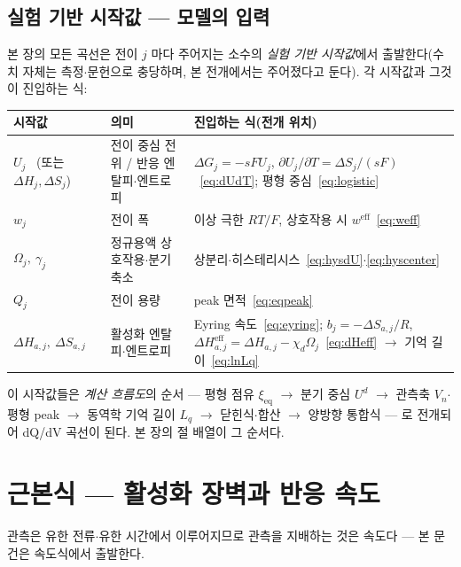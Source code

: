 \documentclass[11pt,a4paper]{article}
\newcommand{\eff}{\mathrm{eff}}
\newcommand{\eq}{\mathrm{eq}}
\begin{document}

\subsection{실험 기반 시작값 — 모델의 입력}\label{sec:inputs}
본 장의 모든 곡선은 전이 $j$ 마다 주어지는 소수의 \emph{실험 기반 시작값}에서 출발한다(수치 자체는 측정$\cdot$문헌으로 충당하며, 본 전개에서는 주어졌다고 둔다). 각 시작값과 그것이 진입하는 식:
\begin{center}
\renewcommand{\arraystretch}{1.25}
\begin{tabular}{p{} p{} p{}}
\toprule
시작값 & 의미 & 진입하는 식(전개 위치) \\
\midrule
$U_j$ \ (또는 $\Delta H_j,\Delta S_j$) & 전이 중심 전위 / 반응 엔탈피$\cdot$엔트로피 & $\Delta G_j=-sFU_j$, $\partial U_j/\partial T=\Delta S_j/(sF)$~\eqref{eq:dUdT}; 평형 중심~\eqref{eq:logistic} \\
$w_j$ & 전이 폭 & 이상 극한 $RT/F$, 상호작용 시 $w^{\eff}$~\eqref{eq:weff} \\
$\Omega_j,\ \gamma_j$ & 정규용액 상호작용$\cdot$분기 축소 & 상분리$\cdot$히스테리시스~\eqref{eq:hysdU}$\cdot$\eqref{eq:hyscenter} \\
$Q_j$ & 전이 용량 & peak 면적~\eqref{eq:eqpeak} \\
$\Delta H_{a,j},\ \Delta S_{a,j}$ & 활성화 엔탈피$\cdot$엔트로피 & Eyring 속도~\eqref{eq:eyring}; $b_j=-\Delta S_{a,j}/R$, $\Delta H_{a,j}^{\eff}=\Delta H_{a,j}-\chi_d\Omega_j$~\eqref{eq:dHeff} $\to$ 기억 길이~\eqref{eq:lnLq} \\
\bottomrule
\end{tabular}
\end{center}
이 시작값들은 \emph{계산 흐름도}의 순서 — 평형 점유 $\xi_{\eq}$ $\to$ 분기 중심 $U^d$ $\to$ 관측축 $V_n$$\cdot$평형 peak $\to$ 동역학 기억 길이 $L_q$ $\to$ 닫힌식$\cdot$합산 $\to$ 양방향 통합식 — 로 전개되어 dQ/dV 곡선이 된다. 본 장의 절 배열이 그 순서다.

\section{근본식 — 활성화 장벽과 반응 속도}\label{sec:rate}
관측은 유한 전류$\cdot$유한 시간에서 이루어지므로 관측을 지배하는 것은 속도다 — 본 문건은 속도식에서 출발한다.
\end{document}
